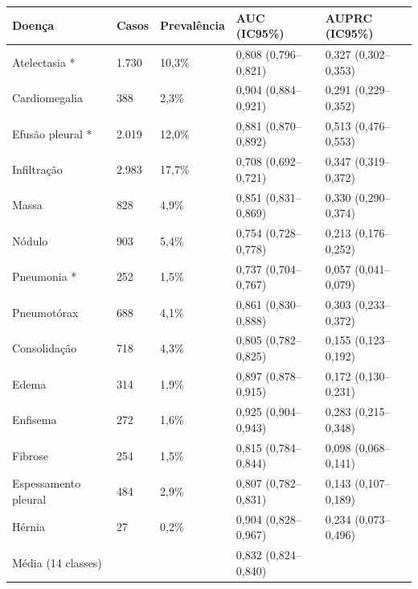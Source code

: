 \begin{tabular}{lllll}
\toprule
Doença & Casos & Prevalência & AUC (IC95\%) & AUPRC (IC95\%) \\
\midrule
Atelectasia * & 1.730 & 10,3\% & 0,808 (0,796–0,821) & 0,327 (0,302–0,353) \\
Cardiomegalia & 388 & 2,3\% & 0,904 (0,884–0,921) & 0,291 (0,229–0,352) \\
Efusão pleural * & 2.019 & 12,0\% & 0,881 (0,870–0,892) & 0,513 (0,476–0,553) \\
Infiltração & 2.983 & 17,7\% & 0,708 (0,692–0,721) & 0,347 (0,319–0,372) \\
Massa & 828 & 4,9\% & 0,851 (0,831–0,869) & 0,330 (0,290–0,374) \\
Nódulo & 903 & 5,4\% & 0,754 (0,728–0,778) & 0,213 (0,176–0,252) \\
Pneumonia * & 252 & 1,5\% & 0,737 (0,704–0,767) & 0,057 (0,041–0,079) \\
Pneumotórax & 688 & 4,1\% & 0,861 (0,830–0,888) & 0,303 (0,233–0,372) \\
Consolidação & 718 & 4,3\% & 0,805 (0,782–0,825) & 0,155 (0,123–0,192) \\
Edema & 314 & 1,9\% & 0,897 (0,878–0,915) & 0,172 (0,130–0,231) \\
Enfisema & 272 & 1,6\% & 0,925 (0,904–0,943) & 0,283 (0,215–0,348) \\
Fibrose & 254 & 1,5\% & 0,815 (0,784–0,844) & 0,098 (0,068–0,141) \\
Espessamento pleural & 484 & 2,9\% & 0,807 (0,782–0,831) & 0,143 (0,107–0,189) \\
Hérnia & 27 & 0,2\% & 0,904 (0,828–0,967) & 0,234 (0,073–0,496) \\
Média (14 classes) &  &  & 0,832 (0,824–0,840) &  \\
\bottomrule
\end{tabular}
